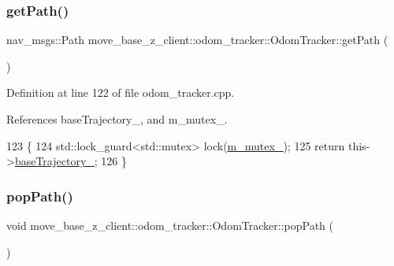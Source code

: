 \mbox{\label{classmove__base__z__client_1_1odom__tracker_1_1OdomTracker_ac6fe40f7ad67c80068ac1320e1a3d040}} 
\subsubsection{\texorpdfstring{get\+Path()}{getPath()}}
{\footnotesize\ttfamily nav\+\_\+msgs\+::\+Path move\+\_\+base\+\_\+z\+\_\+client\+::odom\+\_\+tracker\+::\+Odom\+Tracker\+::get\+Path (\begin{DoxyParamCaption}{ }\end{DoxyParamCaption})}



Definition at line 122 of file odom\+\_\+tracker.\+cpp.



References base\+Trajectory\+\_\+, and m\+\_\+mutex\+\_\+.


\begin{DoxyCode}
123 \{
124     std::lock\_guard<std::mutex> lock(\hyperlink{classmove__base__z__client_1_1odom__tracker_1_1OdomTracker_a63676e03be48b18ac48d5e2f11f19a25}{m\_mutex\_});
125     \textcolor{keywordflow}{return} this->\hyperlink{classmove__base__z__client_1_1odom__tracker_1_1OdomTracker_a83fa5a9bfe0b2683eee33444d3f030ea}{baseTrajectory\_};
126 \}
\end{DoxyCode}
\mbox{\label{classmove__base__z__client_1_1odom__tracker_1_1OdomTracker_ad7bc705c10a84b14df4e7d937e4e5f7e}} 
\subsubsection{\texorpdfstring{pop\+Path()}{popPath()}}
{\footnotesize\ttfamily void move\+\_\+base\+\_\+z\+\_\+client\+::odom\+\_\+tracker\+::\+Odom\+Tracker\+::pop\+Path (\begin{DoxyParamCaption}{ }\end{DoxyParamCaption})}



